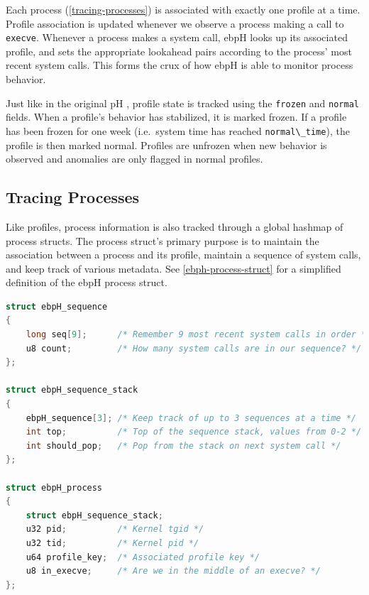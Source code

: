 \documentclass[
  12pt]{findlay}
\newcommand{\passthrough}[1]{#1}
\begin{document}
Each process (\autoref{tracing-processes}) is associated with exactly
one profile at a time. Profile association is updated whenever we
observe a process making a call to \passthrough{\lstinline!execve!}.
Whenever a process makes a system call, ebpH looks up its associated
profile, and sets the appropriate lookahead pairs according to the
process' most recent system calls. This forms the crux of how ebpH is
able to monitor process behavior.

Just like in the original pH \autocite{soma02}, profile state is tracked
using the \passthrough{\lstinline!frozen!} and
\passthrough{\lstinline!normal!} fields. When a profile's behavior has
stabilized, it is marked frozen. If a profile has been frozen for one
week (i.e.~system time has reached
\passthrough{\lstinline!normal\_time!}), the profile is then marked
normal. Profiles are unfrozen when new behavior is observed and
anomalies are only flagged in normal profiles.

\hypertarget{tracing-processes}{%
\subsection{Tracing Processes}\label{tracing-processes}}

Like profiles, process information is also tracked through a global
hashmap of process structs. The process struct's primary purpose is to
maintain the association between a process and its profile, maintain a
sequence of system calls, and keep track of various metadata. See
\autoref{ebph-process-struct} for a simplified definition of the ebpH
process struct.

\begin{lstlisting}[float={ht}, language=c, label={ebph-process-struct}, caption={A simplified
definition of the ebpH process struct.}]
struct ebpH_sequence
{
    long seq[9];      /* Remember 9 most recent system calls in order */
    u8 count;         /* How many system calls are in our sequence? */
};

struct ebpH_sequence_stack
{
    ebpH_sequence[3]; /* Keep track of up to 3 sequences at a time */
    int top;          /* Top of the sequence stack, values from 0-2 */
    int should_pop;   /* Pop from the stack on next system call */
};

struct ebpH_process
{
    struct ebpH_sequence_stack;
    u32 pid;          /* Kernel tgid */
    u32 tid;          /* Kernel pid */
    u64 profile_key;  /* Associated profile key */
    u8 in_execve;     /* Are we in the middle of an execve? */
};
\end{lstlisting}
\end{document}

